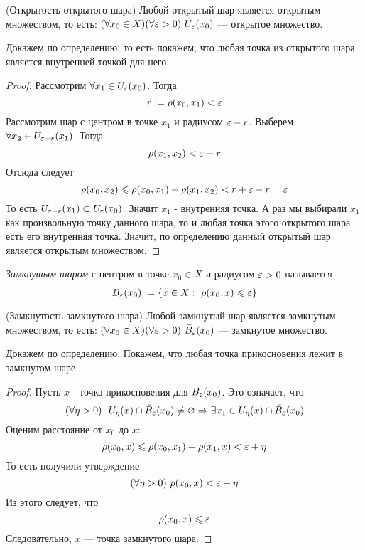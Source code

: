 \begin{lemma} (Открытость открытого шара) Любой открытый
	шар является открытым множеством, то есть:
	$(\forall x_0 \in X)(\forall \varepsilon > 0)\ U_\varepsilon(x_0)$
	--- открытое множество.
\end{lemma}

\begin{idea}
	Докажем по определению, то есть покажем, что любая точка
	из открытого шара является внутренней точкой для него.
\end{idea}

\begin{proof}
	Рассмотрим $\forall x_1 \in U_\varepsilon(x_0)$. Тогда
	\[
		r := \rho(x_0, x_1) < \varepsilon
	\]
	Рассмотрим шар с центром в точке $x_1$ и
	радиусом $\varepsilon - r$. Выберем
	$\forall x_2 \in U_{\varepsilon - r}(x_1)$. Тогда
	\[
		\rho(x_1, x_2) < \varepsilon - r
	\]
	Отсюда следует
	\[
		\rho(x_0, x_2) \leqslant \rho(x_0, x_1) +
		\rho(x_1, x_2) < r + \varepsilon - r = \varepsilon
	\]
	То есть $U_{\varepsilon - r}(x_1)
	\subset U_\varepsilon(x_0)$. Значит $x_1$ - внутренняя точка.
	А раз мы выбирали $x_1$ как произвольную точку данного шара,
	то и любая точка этого открытого шара есть его внутренняя точка.
	Значит, по определению данный открытый шар является открытым множеством.
\end{proof}

\begin{definition}
	\textit{Замкнутым шаром} с центром в точке
	$x_0 \in X$ и радиусом $\varepsilon > 0$ называется
	\[
		\bar{B}_\varepsilon(x_0) :=
		\{x \in X :\  \rho(x_0, x) \leqslant \varepsilon\}
	\] 
\end{definition}

\begin{lemma} (Замкнутость замкнутого шара) Любой замкнутый
	шар является замкнутым множеством, то есть:
	$(\forall x_0 \in X)(\forall \varepsilon > 0)\ \bar{B}_\varepsilon(x_0)$
	--- замкнутое множество.
\end{lemma}

\begin{idea}
	Докажем по определению. Покажем, что любая точка
	прикосновения лежит в замкнутом шаре.
\end{idea}

\begin{proof}
	Пусть $x$ - точка прикосновения для
	$\bar{B}_\varepsilon(x_0)$. Это означает, что
	\[
		(\forall \eta > 0)\ \ U_\eta(x) \cap
		\bar{B}_\varepsilon(x_0) \neq \varnothing \Rightarrow
		\exists x_1 \in U_\eta(x) \cap \bar{B}_\varepsilon(x_0)
	\]
	Оценим расстояние от $x_0$ до $x$:
	\[
		\rho(x_0, x) \leqslant \rho(x_0, x_1) + \rho(x_1, x) <
		\varepsilon + \eta
	\]
	То есть получили утверждение
	\[
		(\forall \eta > 0)\ \rho(x_0, x) < \varepsilon + \eta
	\]
	Из этого следует, что
	\[
		\rho(x_0, x) \leqslant \varepsilon
	\]
	Следовательно, $x$ --- точка замкнутого шара.
\end{proof}


